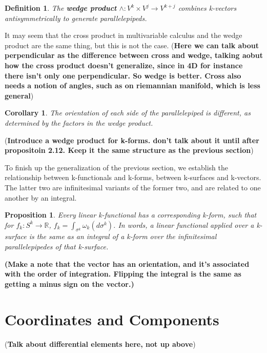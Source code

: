 \documentclass{book}
\newtheorem{defn}[equation]{Definition}
\newtheorem{coro}[equation]{Corollary}
\newtheorem{prop}[equation]{Proposition}
\begin{document}
\begin{defn}
	
	The \textbf{wedge product} $\wedge : V^k\times V^j \to V^{k+j}$ combines k-vectors antisymmetrically to generate parallelepipeds. 
\end{defn}

It may seem that the cross product in multivariable calculus and the wedge product are the same thing, but this is not the case. (\textbf{Here we can talk about perpendicular as the difference between cross and wedge, talking aobut how the cross product doesn't generalize, since in 4D for instance there isn't only one perpendicular. So wedge is better. Cross also needs a notion of angles, such as on riemannian manifold, which is less general})

\begin{coro}
	The orientation of each side of the parallelepiped is different, as determined by the factors in the wedge product. 
\end{coro}


(\textbf{Introduce a wedge product for k-forms. don't talk about it until after propositoin 2.12. Keep it the same structure as the previous section})



To finish up the generalization of the previous section, we establish the relationship between k-functionals and k-forms, between k-surfaces and k-vectors. The latter two are infinitesimal variants of the former two, and are related to one another by an integral. 

\begin{prop}
	Every linear k-functional has a corresponding k-form, such that for $f_k : S^k \to \mathbb{R}$, $f_k = \int_{\sigma^k} \omega_k(d\sigma^k)$. In words, a linear functional applied over a k-surface is the same as an integral of a k-form over the infinitesimal parallelepipedes of that k-surface. 
\end{prop}

\textbf{(Make a note that the vector has an orientation, and it's associated with the order of integration. Flipping the integral is the same as getting a minus sign on the vector.)}

\section{Coordinates and Components} 

(\textbf{Talk about differential elements here, not up above})
\end{document}
